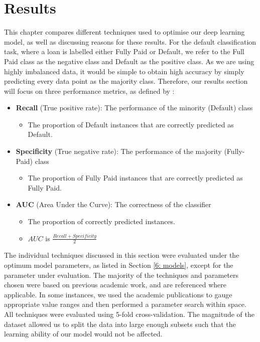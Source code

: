 \chapter{Results} \label{5: Results}

    This chapter compares different techniques used to optimise our deep learning model, as well as discussing reasons for these results. For the default classification task, where a loan is labelled either Fully Paid or Default, we refer to the Full Paid class as the negative class and Default as the positive class. As we are using highly imbalanced data, it would be simple to obtain high accuracy by simply predicting every data point as the majority class. Therefore, our results section will focus on three performance metrics, as defined by \cite{performance_metrics}:
    
    \begin{itemize}
      \item \textbf{Recall} (True positive rate): The performance of the minority (Default) class
        \begin{itemize}
            \item The proportion of Default instances that are correctly predicted as Default.
        \end{itemize}
      \item \textbf{Specificity} (True negative rate): The performance of the majority (Fully-Paid) class
        \begin{itemize}
            \item The proportion of Fully Paid instances that are correctly predicted as Fully Paid.
        \end{itemize}
      \item \textbf{AUC} (Area Under the Curve): The correctness of the classifier
        \begin{itemize}
            \item The proportion of correctly predicted instances.
            \item $AUC$ is $\frac{Recall + Specificity}{2}$ 
        \end{itemize}
    \end{itemize}
    
    The individual techniques discussed in this section were evaluated under the optimum model parameters, as listed in Section \ref{6: models}, except for the parameter under evaluation. The majority of the techniques and parameters chosen were based on previous academic work, and are referenced where applicable. In some instances, we used the academic publications to gauge appropriate value ranges and then performed a parameter search within space. All techniques were evaluated using 5-fold cross-validation. The magnitude of the dataset allowed us to split the data into large enough subsets such that the learning ability of our model would not be affected. 
    
